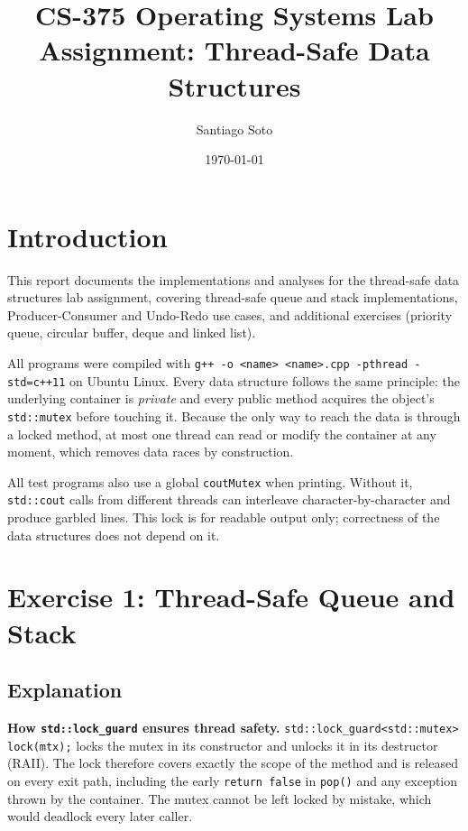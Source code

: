 \documentclass[11pt]{article}
\newcommand{\src}{../src}
\begin{document}
\sloppy

\title{CS-375 Operating Systems Lab Assignment: Thread-Safe Data Structures}
\author{Santiago Soto} %
\date{\today}
\maketitle

\tableofcontents
\newpage

\section{Introduction}
This report documents the implementations and analyses for the thread-safe
data structures lab assignment, covering thread-safe queue and stack
implementations, Producer-Consumer and Undo-Redo use cases, and additional
exercises (priority queue, circular buffer, deque and linked list).

All programs were compiled with
\texttt{g++ -o <name> <name>.cpp -pthread -std=c++11} on Ubuntu Linux.
Every data structure follows the same principle: the underlying container is
\emph{private} and every public method acquires the object's
\texttt{std::mutex} before touching it. Because the only way to reach the data
is through a locked method, at most one thread can read or modify the
container at any moment, which removes data races by construction.

All test programs also use a global \texttt{coutMutex} when printing. Without
it, \texttt{std::cout} calls from different threads can interleave
character-by-character and produce garbled lines. This lock is for readable
output only; correctness of the data structures does not depend on it.

\section{Exercise 1: Thread-Safe Queue and Stack}


\subsection*{Explanation}
\textbf{How \texttt{std::lock\_guard} ensures thread safety.}
\texttt{std::lock\_guard<std::mutex> lock(mtx);} locks the mutex in its
constructor and unlocks it in its destructor (RAII). The lock therefore covers
exactly the scope of the method and is released on every exit path, including
the early \texttt{return false} in \texttt{pop()} and any exception thrown by
the container. The mutex cannot be left locked by mistake, which would
deadlock every later caller.
\end{document}
